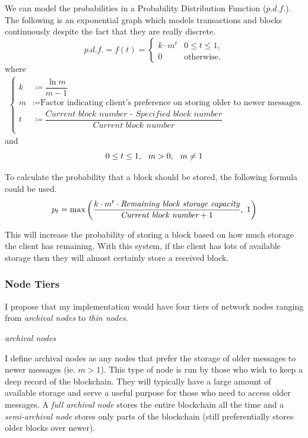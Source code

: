 \documentclass{article}
\begin{document}
We can model the probabilities in a Probability Distribution Function ($p.d.f.$). The following is an exponential graph which models transactions and blocks continuously despite the fact that they are really discrete.
\[ \]
\[p.d.f. = f(t) = 
\begin{cases}
        k \cdot m^{t} &0 \leq t \leq 1, \\[6pt]
        0 &\textrm{otherwise.}
    \end{cases}
\]
where
\begin{align*}
    \begin{cases}
        k &\coloneqq \dfrac{\ln{m}}{m-1} \\[6pt]
        m &\coloneqq \textrm{Factor indicating client's preference on storing older to newer messages.} \\[6pt]
        t &\coloneqq \dfrac{\textit{Current block number - Specified block number}}{\textit{Current block number}} \\[6pt]
    \end{cases}
\end{align*}
and
\[
0 \leq t \leq 1, \hspace{0.25cm}
m > 0, \hspace{0.25cm}
m \not= 1
\]

To calculate the probability that a block should be stored, the following formula could be used.
\[
p_t = \max\left(\dfrac{k \cdot m^t \cdot \textit{Remaining block storage capacity}}{\textit{Current block number} + 1}, \hspace{0.1cm} 1\right)
\]

This will increase the probability of storing a block based on how much storage the client has remaining. With this system, if the client has lots of available storage then they will almost certainly store a received block.

\newpage

\subsubsection{Node Tiers}

I propose that my implementation would have four tiers of network nodes ranging from \textit{archival nodes} to \textit{thin nodes}.

\begin{center}
    \Large{\textit{archival nodes}}
\end{center}

I define archival nodes as any nodes that prefer the storage of older messages to newer messages (ie. $m > 1$). This type of node is run by those who wish to keep a deep record of the blockchain. They will typically have a large amount of available storage and serve a useful purpose for those who need to access older messages. A \textit{full archival node} stores the entire blockchain all the time and a \textit{semi-archival node} stores only parts of the blockchain (still preferentially stores older blocks over newer).
\end{document}
